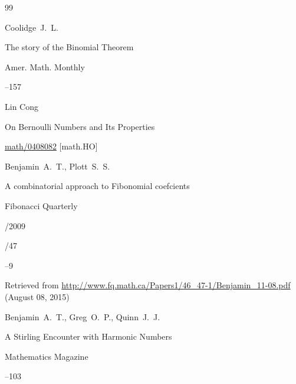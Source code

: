 \EngRef





\begin{thebibliography}{99}




\by Coolidge~J.~L. 

\paper  The story of the Binomial Theorem 

\jour Amer. Math. Monthly 



--157






\by  Lin Cong

\preprint On Bernoulli Numbers and Its Properties

\arxiv \href{http://arxiv.org/abs/math/0408082}{math/0408082} [math.HO]






\by Benjamin~A.~T., Plott~S.~S.

\paper A combinatorial approach to Fibonomial coefcients

\jour Fibonacci Quarterly

/2009

/47


--9

\elink  Retrieved from   \url{http://www.fq.math.ca/Papers1/46_47-1/Benjamin_11-08.pdf} (August 08, 2015)




\by Benjamin~A.~T., Greg~O.~P., Quinn~J.~J.

\paper A Stirling Encounter with Harmonic Numbers

\jour Mathematics Magazine




--103





\end{thebibliography}
